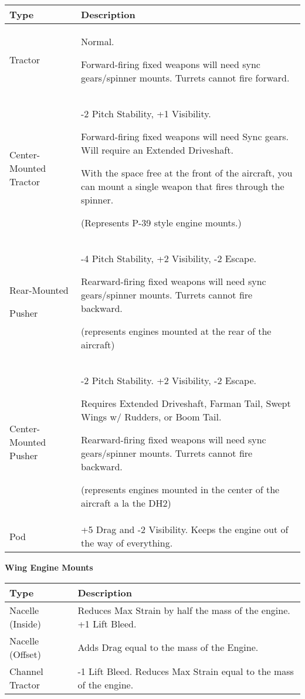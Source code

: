 \documentclass{article}
\begin{document}
\begin{tabular}{|l|l|}
    \hline
    Type                   & Description                                                   \\\hline
    Tractor                & Normal.

    Forward-firing fixed weapons will need sync gears/spinner mounts.
    Turrets cannot fire forward.                                                           \\\hline
    Center-Mounted Tractor & -2 Pitch Stability, +1 Visibility.

    Forward-firing fixed weapons will need Sync gears. Will require an
    Extended Driveshaft.

    With the space free at the front of the aircraft, you can mount a single
    weapon that fires through the spinner.

    (Represents P-39 style engine mounts.)                                                 \\\hline
    Rear-Mounted

    Pusher                 & -4 Pitch Stability, +2 Visibility, -2 Escape.

    Rearward-firing fixed weapons will need sync gears/spinner mounts.
    Turrets cannot fire backward.

    (represents engines mounted at the rear of the aircraft)                               \\\hline
    Center-Mounted Pusher  & -2 Pitch Stability. +2 Visibility, -2 Escape.

    Requires Extended Driveshaft, Farman Tail, Swept Wings w/ Rudders, or
    Boom Tail.

    Rearward-firing fixed weapons will need sync gears/spinner mounts.
    Turrets cannot fire backward.

    (represents engines mounted in the center of the aircraft a la the
    DH2)                                                                                   \\\hline
    Pod                    & +5 Drag and -2 Visibility. Keeps the engine out of the way of
    everything.                                                                            \\\hline
\end{tabular}

\textbf{Wing Engine Mounts}

\begin{tabular}{|l|l|}
    \hline
    Type             & Description                                            \\\hline
    Nacelle (Inside) & Reduces Max Strain by half the mass of the engine. +1
    Lift Bleed.                                                               \\\hline
    Nacelle (Offset) & Adds Drag equal to the mass of the Engine.             \\\hline
    Channel Tractor  & -1 Lift Bleed. Reduces Max Strain equal to the mass of
    the engine.                                                               \\\hline
\end{tabular}
\end{document}
